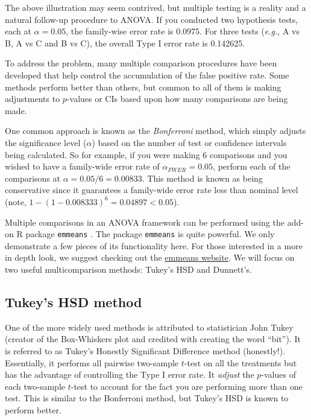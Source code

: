 \documentclass[
]{book}
\begin{document}
The above illustration may seem contrived, but multiple testing is a reality and a natural follow-up procedure to ANOVA.
If you conducted two hypothesis tests, each at \(\alpha=0.05\), the family-wise error rate is 0.0975.
For three tests (\emph{e.g.}, A vs B, A vs C and B vs C), the overall Type I error rate is 0.142625.

To address the problem, many multiple comparison procedures have been developed that help control the accumulation of the false positive rate.
Some methods perform better than others, but common to all of them is making adjustments to \(p\)-values or CIs based upon how many comparisons are being made.

One common approach is known as the \emph{Bonferroni} method, which simply adjusts the significance level (\(\alpha\)) based on the number of test or confidence intervals being calculated.
So for example, if you were making 6 comparisons and you wished to have a family-wide error rate of \(\alpha_{FWER}=0.05\), perform each of the comparisons at \(\alpha = 0.05/6 = 0.00833\).
This method is known as being conservative since it guarantees a family-wide error rate less than nominal level (note, \(1 - (1-0.008333)^6 = 0.04897 < 0.05\)).

Multiple comparisons in an ANOVA framework can be performed using the add-on R package \texttt{emmeans} \citep{R-emmeans}.
The package \texttt{emmeans} is quite powerful. We only demonstrate a few pieces of its functionality here.
For those interested in a more in depth look, we suggest checking out the \href{https://rvlenth.github.io/emmeans/index.html}{emmeans website}.
We will focus on two useful multicomparison methods: Tukey's HSD and Dunnett's.

\hypertarget{tukeys-hsd-method}{%
\subsection{Tukey's HSD method}\label{tukeys-hsd-method}}

One of the more widely used methods is attributed to statistician John Tukey (creator of the Box-Whiskers plot and credited with creating the word ``bit'').
It is referred to as Tukey's Honestly Significant Difference method (honestly!).
Essentially, it performs all pairwise two-sample \(t\)-test on all the treatments but has the advantage of controlling the Type I error rate.
It \emph{adjust} the \(p\)-values of each two-sample \(t\)-test to account for the fact you are performing more than one test.
This is similar to the Bonferroni method, but Tukey's HSD is known to perform better.
\end{document}
